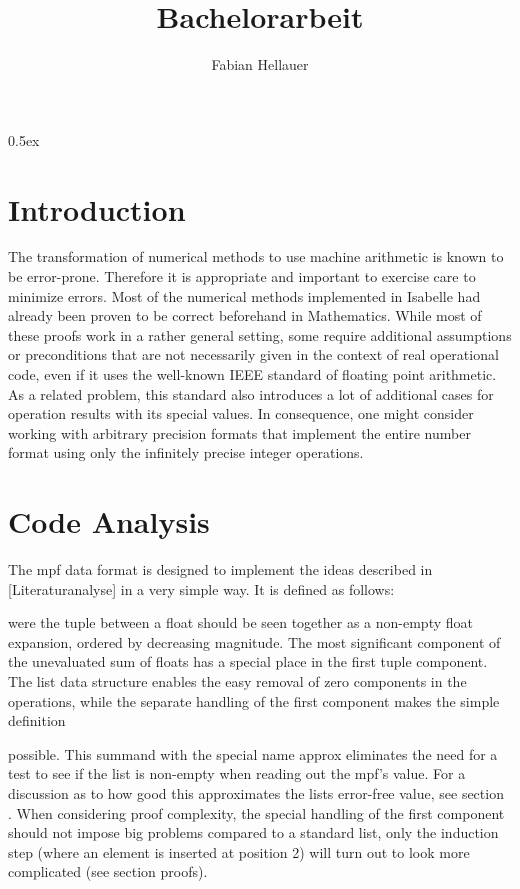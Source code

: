 \documentclass[11pt,a4paper]{article}
\begin{document}
\title{Bachelorarbeit}
\author{Fabian Hellauer}
\maketitle

\tableofcontents

\parindent 0pt\parskip 0.5ex

\section{Introduction}
The transformation of numerical methods to use machine arithmetic is known to be error-prone. Therefore it is appropriate and important to exercise care to minimize errors. Most of the numerical methods implemented in Isabelle had already been proven to be correct beforehand in Mathematics. While most of these proofs work in a rather general setting, some require additional assumptions or preconditions that are not necessarily given in the context of real operational code, even if it uses the well-known IEEE standard of floating point arithmetic. As a related problem, this standard also introduces a lot of additional cases for operation results with its special values. In consequence, one might consider working with arbitrary precision formats that implement the entire number format using only the infinitely precise integer operations.

\section{Code Analysis}

\floatdef

The mpf data format is designed to implement the ideas described in [Literaturanalyse] in a very simple way. It is defined as follows:


were the tuple between a float should be seen together as a non-empty float expansion, ordered by decreasing magnitude. The most significant component of the unevaluated sum of floats has a special place in the first tuple component. The list data structure enables the easy removal of zero components in the operations, while the separate handling of the first component makes the simple definition


possible. This summand with the special name approx
eliminates the need for a test to see if the list is non-empty when reading out the mpf's value. For a discussion as to how good this approximates the lists error-free value, see section     . When considering proof complexity, the special handling of the first component should not impose big problems compared to a standard list, only the induction step (where an element is inserted at position 2) will turn out to look more complicated (see section proofs).
\end{document}
